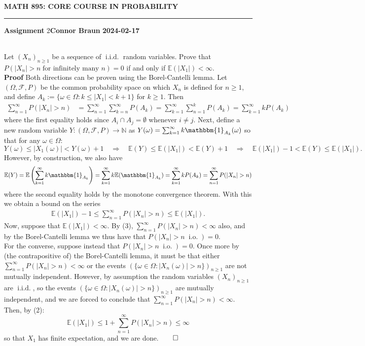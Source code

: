 \documentclass[10pt]{article}
\newcommand{\E}{\mathbb{E}}
\newcommand{\bp}[1]{\left({#1}\right)}
\newcommand{\mbb}[1]{\mathbb{#1}}
\newcommand{\1}[1]{\mathbbm{1}_{#1}}
\newcommand{\mc}[1]{\mathcal{#1}}
\DeclareMathOperator{\io}{i.o.}
\DeclareMathOperator{\iid}{i.i.d.}
\begin{document}
    \begin{center}
        {\bf\large{MATH 895: CORE COURSE IN PROBABILITY}}
        \smallskip
        \hrule
        \smallskip
        {\bf Assignment} 2\hfill {\bf Connor Braun} \hfill {\bf 2024-02-17}
    \end{center}
    \\[5pt]
    Let $(X_n)_{n\geq 1}$ be a sequence of $\iid$ random variables. Prove that $P(|X_n|>n\;\text{for infinitely many $n$})=0$ if and only if $\E(|X_1|)<\infty$.\\[5pt]
    {\bf Proof}\hspace{5pt} Both directions can be proven using the Borel-Cantelli lemma. Let $(\Omega,\mc{F},P)$ be the common probability space on which $X_n$ is defined for $n\geq 1$, and define $A_k:=\{\omega\in\Omega:k\leq |X_1|<k+1\}$ for $k\geq 1$. Then
    \begin{align*}
        \sum_{n=1}^\infty P(|X_n|>n)&=\sum_{n=1}^\infty \sum_{k=n}^\infty P(A_k)=\sum_{k=1}^\infty\sum_{n=1}^kP(A_k)=\sum_{k=1}^\infty kP(A_k)
    \end{align*}
    where the first equality holds since $A_i\cap A_j=\emptyset$ whenever $i\neq j$. Next, define a new random variable $Y:(\Omega,\mc{F},P)\rightarrow\mbb{N}$ as $Y(\omega)=\sum_{k=1}^\infty k\1{A_k}(\omega)$ so that for any $\omega\in\Omega$:
    \[Y(\omega)\leq |X_1(\omega)|<Y(\omega)+1\quad\Rightarrow\quad \E(Y)\leq \E(|X_1|)<\E(Y)+1\quad\Rightarrow\quad \E(|X_1|)-1 <\E(Y)\leq \E(|X_1|).\]
    However, by construction, we also have
    \[\E(Y)=\E\bp{\sum_{k=1}^\infty k\1{A_k}}=\sum_{k=1}^\infty k\E(\1{A_k})=\sum_{k=1}^\infty kP(A_k)=\sum_{n=1}^\infty P(|X_n|>n)\]
    where the second equality holds by the monotone convergence theorem. With this we obtain a bound on the series
    \begin{align*}
        \E(|X_1|)-1\leq \sum_{n=1}^\infty P(|X_n|>n) \leq \E(|X_1|).\tag{2}
    \end{align*}
    Now, suppose that $\E(|X_1|)<\infty$. By (3), $\sum_{n=1}^\infty P(|X_n|>n)<\infty$ also, and by the Borel-Cantelli lemma we thus have that $P(|X_n|>n\;\io)=0$. \\[5pt]
    For the converse, suppose instead that $P(|X_n|>n\;\io)=0$. Once more by (the contrapositive of) the Borel-Cantelli lemma, it must be that either $\sum_{n=1}^\infty P(|X_n|>n)<\infty$ or the events $(\{\omega\in\Omega:|X_n(\omega)|>n\})_{n\geq 1}$ are not mutually independent.
    However, by assumption the random variables $(X_n)_{n\geq 1}$ are $\iid$, so the events $(\{\omega\in\Omega:|X_n(\omega)|>n\})_{n\geq 1}$ are mutually independent, and we are forced to conclude that $\sum_{n=1}^\infty P(|X_n|>n)<\infty$. Then, by (2):
    \[\E(|X_1|)\leq 1+\sum_{n=1}^\infty P(|X_n|>n)\leq \infty\]
    so that $X_1$ has finite expectation, and we are done.\hfill{$\qed$}\\[5pt]
\end{document}
